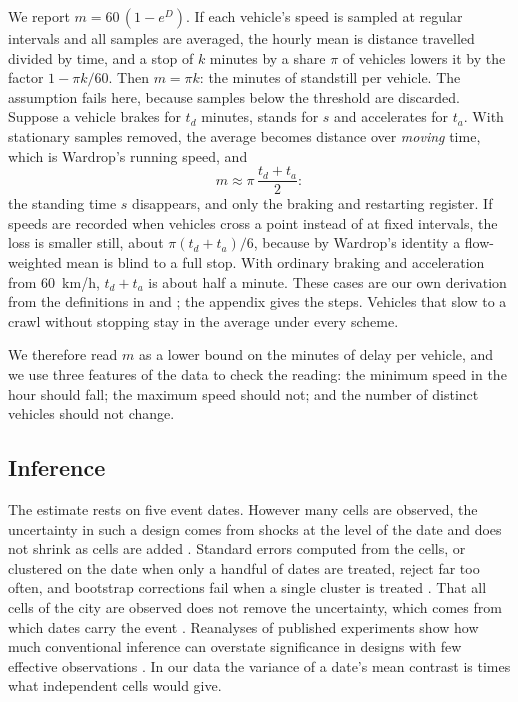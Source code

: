 \documentclass[11pt,a4paper]{article}
\begin{document}
We report $m = 60\,(1 - e^{D})$. If each vehicle's speed is sampled at regular intervals and all
samples are averaged, the hourly mean is distance travelled divided by time, and a stop of $k$
minutes by a share $\pi$ of vehicles lowers it by the factor $1 - \pi k/60$. Then $m = \pi k$: the
minutes of standstill per vehicle. The assumption fails here, because samples below the threshold are
discarded. Suppose a vehicle brakes for $t_d$ minutes, stands for $s$ and accelerates for $t_a$.
With stationary samples removed, the average becomes distance over \emph{moving} time, which is
Wardrop's running speed, and
\begin{equation}
m \approx \pi\,\frac{t_d + t_a}{2}:
\end{equation}
the standing time $s$ disappears, and only the braking and restarting register. If speeds are
recorded when vehicles cross a point instead of at fixed intervals, the loss is smaller still, about
$\pi (t_d + t_a)/6$, because by Wardrop's identity a flow-weighted mean is blind to a full stop.
With ordinary braking and acceleration from 60~km/h, $t_d + t_a$ is about half a minute. These cases
are our own derivation from the definitions in \citet{wardrop1952} and \citet{herrera2010}; the
appendix gives the steps. Vehicles that slow to a crawl without stopping stay in the average under
every scheme.

We therefore read $m$ as a lower bound on the minutes of delay per vehicle, and we use three
features of the data to check the reading: the minimum speed in the hour should fall; the maximum
speed should not; and the number of distinct vehicles should not change.

\subsection{Inference}

The estimate rests on five event dates. However many cells are observed, the uncertainty in such a
design comes from shocks at the level of the date and does not shrink as cells are added
\citep{conley2011,ferman2019}. Standard errors computed from the cells, or clustered on the date
when only a handful of dates are treated, reject far too often, and bootstrap corrections fail when
a single cluster is treated \citep{mackinnon2017,mackinnon2018,bertrand2004}. That all cells of the
city are observed does not remove the uncertainty, which comes from which dates carry the event
\citep{abadie2020}. Reanalyses of published experiments show how much conventional inference can
overstate significance in designs with few effective observations \citep{young2019}. In our data the variance of a date's mean contrast is
\designEffect{} times what independent cells would give.
\end{document}
